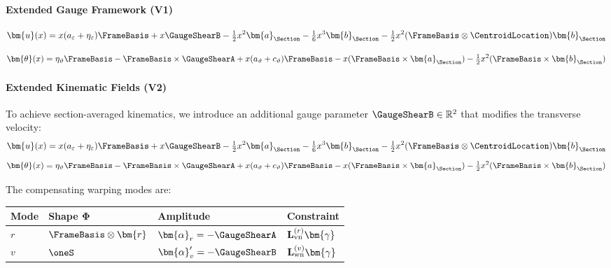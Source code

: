 
\paragraph{Extended Gauge Framework (V1)}

\[
\bm{u}(x) = x(a_\varepsilon + \eta_\varepsilon)\FrameBasis + x\GaugeShearB - \tfrac{1}{2}x^2\bm{a}_{\Section} - \tfrac{1}{6}x^3\bm{b}_{\Section} - \tfrac{1}{2}x^2(\FrameBasis\otimes\CentroidLocation)\bm{b}_{\Section}
\]

\[
\bm{\theta}(x) = \eta_\vartheta\FrameBasis - \FrameBasis\times\GaugeShearA + x(a_\vartheta + c_\vartheta)\FrameBasis - x(\FrameBasis\times\bm{a}_{\Section}) - \tfrac{1}{2}x^2(\FrameBasis\times\bm{b}_{\Section})
\]


\paragraph{Extended Kinematic Fields (V2)}

To achieve section-averaged kinematics, we introduce an additional gauge
parameter \(\GaugeShearB \in \mathbb{R}^2\) that modifies the transverse
velocity:
\[
\bm{u}(x) = x(a_\varepsilon + \eta_\varepsilon)\FrameBasis + x\GaugeShearB - \tfrac{1}{2}x^2\bm{a}_{\Section} - \tfrac{1}{6}x^3\bm{b}_{\Section} - \tfrac{1}{2}x^2(\FrameBasis\otimes\CentroidLocation)\bm{b}_{\Section}\]
\[\bm{\theta}(x) = \eta_\vartheta\FrameBasis - \FrameBasis\times\GaugeShearA + x(a_\vartheta + c_\vartheta)\FrameBasis - x(\FrameBasis\times\bm{a}_{\Section}) - \tfrac{1}{2} x^2(\FrameBasis\times\bm{b}_{\Section})
\]

The compensating warping modes are:

\begin{longtable}[]{@{}
  >{\raggedright\arraybackslash}p{}
  >{\raggedright\arraybackslash}p{}
  >{\raggedright\arraybackslash}p{}
  >{\raggedright\arraybackslash}p{}@{}}
\toprule\noalign{}
\begin{minipage}[b]{\linewidth}\raggedright
Mode
\end{minipage} & \begin{minipage}[b]{\linewidth}\raggedright
Shape \(\bm{\Phi}\)
\end{minipage} & \begin{minipage}[b]{\linewidth}\raggedright
Amplitude
\end{minipage} & \begin{minipage}[b]{\linewidth}\raggedright
Constraint
\end{minipage} \\
\midrule\noalign{}
\endhead
\bottomrule\noalign{}
\endlastfoot
\(r\) & \(\FrameBasis\otimes\bm{r}\) &
\(\bm{\alpha}_r = -\GaugeShearA\) &
\(\mathbf{L}_{\rm vn}^{(r)}\bm{\gamma}\) \\
\(v\) & \(\oneS\) & \(\bm{\alpha}'_v = -\GaugeShearB\) &
\(\mathbf{L}_{\rm wn}^{(v)}\bm{\gamma}\) \\
\end{longtable}

